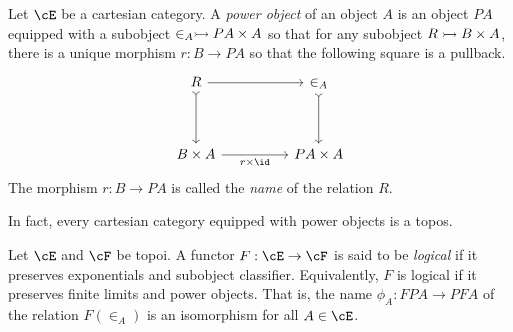 \documentclass[article,10pt,oneside]{memoir}
\begin{document}
\begin{defn}
  Let $\cE$ be a cartesian category.
  A \emph{power object} of an object $A$ is an object $PA$ equipped with a subobject $\in_{A} \rightarrowtail PA \times A$ so that for any subobject $R \rightarrowtail B \times A$, there is a unique morphism $r : B \to PA$ so that the following square is a pullback.
  \[\begin{tikzcd}
      R && {\in_{A}} \\
      \\
      {B \times A} && {PA \times A}
      \arrow[tail, from=1-3, to=3-3]
      \arrow["{r \times \id}"', from=3-1, to=3-3]
      \arrow[tail, from=1-1, to=3-1]
      \arrow[from=1-1, to=1-3]
    \end{tikzcd}\]
  The morphism $r : B \to PA$ is called the \emph{name} of the relation $R$.
\end{defn}
In fact, every cartesian category equipped with power objects is a topos.

\begin{defn}
  Let $\cE$ and $\cF$ be topoi.
  A functor $F : \cE \to \cF$ is said to be \emph{logical} if it preserves exponentials and subobject classifier.
  Equivalently, $F$ is logical if it preserves finite limits and power objects.
  That is, the name $\phi_{A} : FPA \to PFA$ of the relation $F(\in_{A})$ is an isomorphism for all $A \in \cE$.
\end{defn}



\end{document}
